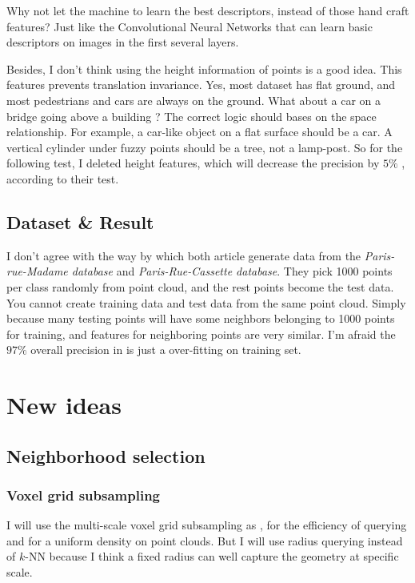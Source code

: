 \documentclass{article}
\begin{document}
Why not let the machine to learn the best descriptors, instead of those hand craft features? Just like the Convolutional Neural Networks that can learn basic descriptors on images in the first several layers.

Besides, I don't think using the height information of points is a good idea. This features prevents translation invariance. Yes, most dataset has flat ground, and most pedestrians and cars are always on the ground. What about a car on a bridge going above a building ? The correct logic should bases on the space relationship. For example, a car-like object on a flat surface should be a car. A vertical cylinder under fuzzy points should be a tree, not a lamp-post. So for the following test, I deleted height features, which will decrease the precision by $5\%$ \cite{hackel2016fast}, according to their test.

\subsection{Dataset \& Result}
I don't agree with the way by which both article generate data from the \textit{Paris-rue-Madame database} and \textit{Paris-Rue-Cassette database}. They pick 1000 points per class randomly from point cloud, and the rest points become the test data. You cannot create training data and test data from the same point cloud. Simply because many testing points will have some neighbors belonging to 1000 points for training, and features for neighboring points are very similar. I'm afraid the $97\%$ overall precision in \cite{hackel2016fast} is just a over-fitting on training set.

\section{New ideas}
\subsection{Neighborhood selection}
\subsubsection{Voxel grid subsampling}
I will use the multi-scale voxel grid subsampling as \cite{hackel2016fast}, for the efficiency of querying and for a uniform density on point clouds. But I will use radius querying instead of $k$-NN because I think a fixed radius can well capture the geometry at specific scale. 
\end{document}
